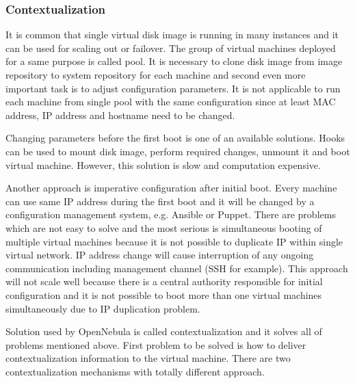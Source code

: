\subsubsection{Contextualization}
It is common that single virtual disk image is running in many instances and it can be used for scaling out or failover. The group of virtual machines deployed for a same purpose is called pool. It is necessary to clone disk image from image repository to system repository for each machine and second even more important task is to adjust configuration parameters. It is not applicable to run each machine from single pool with the same configuration since at least \Ac{MAC} address, \Ac{IP} address and hostname need to be changed.

Changing parameters before the first boot is one of an available solutions. Hooks can be used to mount disk image, perform required changes, unmount it and boot virtual machine. However, this solution is slow and computation expensive.

Another approach is imperative configuration after initial boot. Every machine can use same \Ac{IP} address during the first boot and it will be changed by a configuration management system, e.g. Ansible or Puppet. There are problems which are not easy to solve and the most serious is simultaneous booting of multiple virtual machines because it is not possible to duplicate \Ac{IP} within single virtual network. \Ac{IP} address change will cause interruption of any ongoing communication including management channel (\Ac{SSH} for example). This approach will not scale well because there is a central authority responsible for initial configuration and it is not possible to boot more than one virtual machines simultaneously due to \Ac{IP} duplication problem.

Solution used by OpenNebula is called contextualization and it solves all of problems mentioned above. First problem to be solved is how to deliver contextualization information to the virtual machine. There are two contextualization mechanisms with totally different approach.


